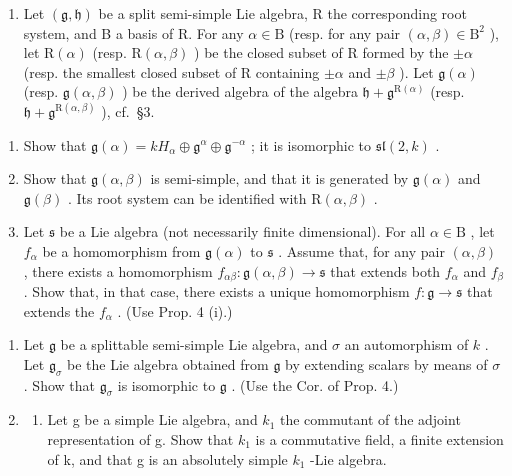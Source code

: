 \begin{enumerate}
\def\labelenumi{\arabic{enumi})}
\setcounter{enumi}{2}
\tightlist
\item
  Let \((\mathfrak{g},\mathfrak{h})\) be a split semi-simple Lie algebra, R the corresponding root system, and B a basis of R. For any \(\alpha \in \mathrm{B}\) (resp. for any pair \((\alpha ,\beta)\in \mathrm{B}^2\) ), let \(\mathrm{R}(\alpha)\) (resp. \(\mathrm{R}(\alpha ,\beta)\) ) be the closed subset of R formed by the \(\pm \alpha\) (resp. the smallest closed subset of R containing \(\pm \alpha\) and \(\pm \beta\) ). Let \(\mathfrak{g}(\alpha)\) (resp. \(\mathfrak{g}(\alpha ,\beta)\) ) be the derived algebra of the algebra \(\mathfrak{h} + \mathfrak{g}^{\mathrm{R}(\alpha)}\) (resp. \(\mathfrak{h} + \mathfrak{g}^{\mathrm{R}(\alpha ,\beta)}\) ), cf.~§3.
\end{enumerate}

\begin{enumerate}
\def\labelenumi{\alph{enumi})}
\item
  Show that \(\mathfrak{g}(\alpha) = kH_{\alpha}\oplus \mathfrak{g}^{\alpha}\oplus \mathfrak{g}^{-\alpha}\) ; it is isomorphic to \(\mathfrak{sl}(2,k)\) .
\item
  Show that \(\mathfrak{g}(\alpha,\beta)\) is semi-simple, and that it is generated by \(\mathfrak{g}(\alpha)\) and \(\mathfrak{g}(\beta)\) . Its root system can be identified with \(\mathrm{R}(\alpha,\beta)\) .
\item
  Let \(\mathfrak{s}\) be a Lie algebra (not necessarily finite dimensional). For all \(\alpha \in \mathrm{B}\) , let \(f_{\alpha}\) be a homomorphism from \(\mathfrak{g}(\alpha)\) to \(\mathfrak{s}\) . Assume that, for any pair \((\alpha, \beta)\) , there exists a homomorphism \(f_{\alpha \beta}: \mathfrak{g}(\alpha, \beta) \to \mathfrak{s}\) that extends both \(f_{\alpha}\) and \(f_{\beta}\) . Show that, in that case, there exists a unique homomorphism \(f: \mathfrak{g} \to \mathfrak{s}\) that extends the \(f_{\alpha}\) . (Use Prop. 4 (i).)
\end{enumerate}

\begin{enumerate}
\def\labelenumi{\arabic{enumi})}
\setcounter{enumi}{3}
\item
  Let \(\mathfrak{g}\) be a splittable semi-simple Lie algebra, and \(\sigma\) an automorphism of \(k\) . Let \(\mathfrak{g}_{\sigma}\) be the Lie algebra obtained from \(\mathfrak{g}\) by extending scalars by means of \(\sigma\) . Show that \(\mathfrak{g}_{\sigma}\) is isomorphic to \(\mathfrak{g}\) . (Use the Cor. of Prop. 4.)
\item
  \begin{enumerate}
  \def\labelenumii{\alph{enumii})}
  \tightlist
  \item
    Let g be a simple Lie algebra, and \(k_{1}\) the commutant of the adjoint representation of g. Show that \(k_{1}\) is a commutative field, a finite extension of k, and that g is an absolutely simple \(k_{1}\) -Lie algebra.
  \end{enumerate}
\end{enumerate}

